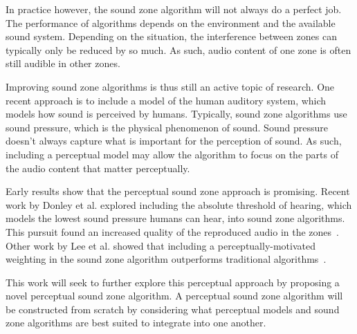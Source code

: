 In practice however, the sound zone algorithm will not always do a perfect job.
The performance of algorithms depends on the environment and the available sound system.
Depending on the situation, the interference between zones can typically only be reduced by so much.
As such, audio content of one zone is often still audible in other zones.

Improving sound zone algorithms is thus still an active topic of research.
One recent approach is to include a model of the human auditory system, which models how sound is perceived by humans.
Typically, sound zone algorithms use sound pressure, which is the physical phenomenon of sound.
Sound pressure doesn't always capture what is important for the perception of sound.
As such, including a perceptual model may allow the algorithm to focus on the parts of the audio content
that matter perceptually.

Early results show that the perceptual sound zone approach is promising.
Recent work by Donley et al. explored including the absolute threshold of hearing, which models the lowest sound pressure
humans can hear, into sound zone algorithms.
This pursuit found an increased quality of the reproduced audio in the zones~\cite{donley2015multizone}.
Other work by Lee et al. showed that including a perceptually-motivated weighting in the sound zone algorithm outperforms 
traditional algorithms~\cite{lee2019towards,lee2020signal}.

This work will seek to further explore this perceptual approach by proposing a novel perceptual sound zone algorithm.
A perceptual sound zone algorithm will be constructed from scratch by considering what perceptual models and sound
zone algorithms are best suited to integrate into one another.
